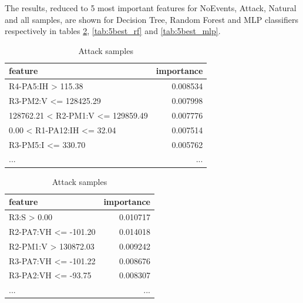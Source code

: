 The results, reduced to 5 most important features for NoEvents, Attack, Natural and all samples, are shown for Decision Tree, Random Forest and MLP classifiers respectively in tables \ref{tab:5best_dt}, \ref{tab:5best_rf} and \ref{tab:5best_mlp}.


\begin{table}[H]
    \footnotesize
    \centering
    \caption{5 most important features by class for Decision Tree classifier} \label{tab:5best_dt}
    \begin{subtable}[t]{0.5\linewidth}
        \centering
        \caption{NoEvents samples} 
        \begin{tabular}{lr}\toprule
            feature  &importance\\\midrule            
            R4-PA5:IH > 115.38                  & 0.008534\\
            R3-PM2:V <= 128425.29               & 0.007998\\
            128762.21 < R2-PM1:V <= 129859.49   & 0.007776\\
            0.00 < R1-PA12:IH <= 32.04          & 0.007514\\
            R3-PM5:I <= 330.70                  & 0.005762\\
            ...                                 & ... \\\bottomrule
        \end{tabular}
    \end{subtable}%
    \begin{subtable}[t]{0.5\linewidth}
        \centering
        \caption{Attack samples} 
        \begin{tabular}{lr}\toprule
            feature                   & importance \\\midrule
            R3:S > 0.00                    & 0.010717  \\
            R2-PA7:VH <= -101.20           & 0.014018   \\
            R2-PM1:V > 130872.03           & 0.009242 \\
            R3-PA7:VH <= -101.22           & 0.008676 \\
            R3-PA2:VH <= -93.75            & 0.008307 \\
            ...                            & ... \\\bottomrule
        \end{tabular}
    \end{subtable}
    \begin{subtable}[b]{0.5\linewidth}

\end{subtable}
\end{table}
